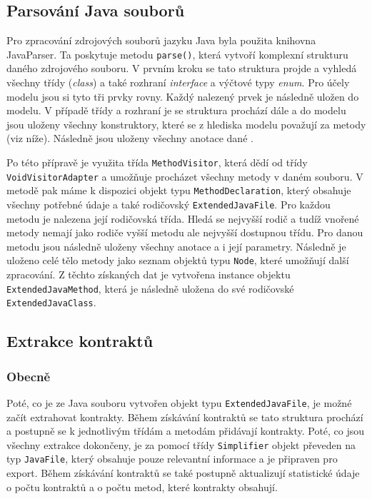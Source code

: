 	    \subsection{Parsování Java souborů}	    
			Pro zpracování zdrojových souborů jazyku Java byla použita knihovna JavaParser. Ta poskytuje metodu \texttt{parse()}, která vytvoří komplexní strukturu daného zdrojového souboru. V prvním kroku se tato struktura projde a vyhledá všechny třídy (\emph{class}) a také rozhraní \emph{interface} a výčtové typy \emph{enum}. Pro účely modelu jsou si tyto tři prvky rovny. Každý nalezený prvek je následně uložen do modelu. V případě třídy a rozhraní je se struktura prochází dále a do modelu jsou uloženy všechny konstruktory, které se z hlediska modelu považují za metody (viz níže). Následně jsou uloženy všechny anotace dané .
			
			Po této přípravě je využita třída \texttt{MethodVisitor}, která dědí od třídy \texttt{VoidVisitorAdapter} a umožňuje procházet všechny metody v daném souboru. V metodě pak máme k dispozici objekt typu \texttt{MethodDeclaration}, který obsahuje všechny potřebné údaje a také rodičovský \texttt{ExtendedJavaFile}. Pro každou metodu je nalezena její rodičovská třída. Hledá se nejvyšší rodič a tudíž vnořené metody nemají jako rodiče vyšší metodu ale nejvyšší dostupnou třídu. Pro danou metodu jsou následně uloženy všechny anotace a i její parametry. Následně je uloženo celé tělo metody jako seznam objektů typu \texttt{Node}, které umožňují další zpracování. Z těchto získaných dat je vytvořena instance objektu \texttt{ExtendedJavaMethod}, která je následně uložena do své rodičovské \texttt{ExtendedJavaClass}.


		\subsection{Extrakce kontraktů}
			
			\subsubsection{Obecně}
				Poté, co je ze Java souboru vytvořen objekt typu \texttt{ExtendedJavaFile}, je možné začít extrahovat kontrakty. Během získávání kontraktů se tato struktura prochází a postupně se k jednotlivým třídám a metodám přidávají kontrakty. Poté, co jsou všechny extrakce dokončeny, je za pomocí třídy \texttt{Simplifier} objekt převeden na typ \texttt{JavaFile}, který obsahuje pouze relevantní informace a je připraven pro export.	Během získávání kontraktů se také postupně aktualizují statistické údaje o počtu kontraktů a o počtu metod, které kontrakty obsahují.		
			
